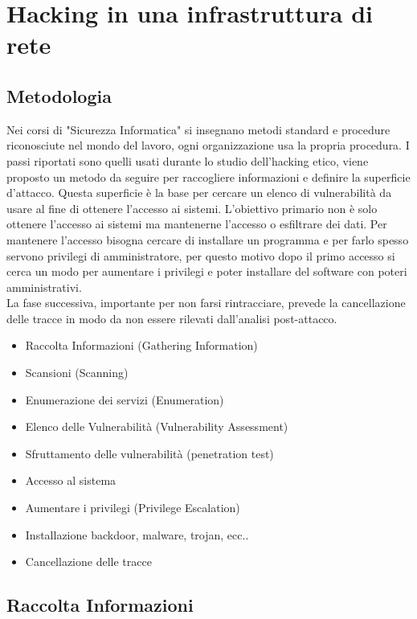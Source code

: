 \chapter{Hacking in una infrastruttura di rete}	 %

\section{Metodologia}

Nei corsi di "Sicurezza Informatica" si insegnano metodi standard e procedure riconosciute nel mondo del lavoro, ogni organizzazione usa la propria procedura. I passi riportati sono quelli usati durante lo studio dell'hacking etico, viene proposto un metodo da seguire per  raccogliere informazioni e definire la superficie d'attacco.
Questa superficie è la base per cercare un elenco di vulnerabilità da usare al fine di ottenere l'accesso ai sistemi. 
L'obiettivo primario non è solo ottenere l'accesso ai sistemi ma mantenerne l'accesso o esfiltrare dei dati.
Per mantenere l'accesso bisogna cercare di installare un programma e per farlo spesso servono privilegi di amministratore, per questo motivo dopo il primo accesso si cerca  un modo per
aumentare i privilegi e poter installare del software con poteri amministrativi.
\\ La fase successiva, importante per non farsi rintracciare, prevede la cancellazione delle tracce in modo da non essere rilevati dall'analisi post-attacco.


\begin{itemize}
    \item Raccolta Informazioni (Gathering Information)
    \item Scansioni (Scanning)
    \item Enumerazione  dei servizi (Enumeration)
    \item Elenco delle Vulnerabilità (Vulnerability Assessment)
    \item Sfruttamento delle vulnerabilità (penetration test)
    \item Accesso al sistema
    \item Aumentare i privilegi (Privilege Escalation)
    \item Installazione backdoor, malware, trojan, ecc..
    \item Cancellazione delle tracce

\end{itemize}

\section{Raccolta Informazioni}

